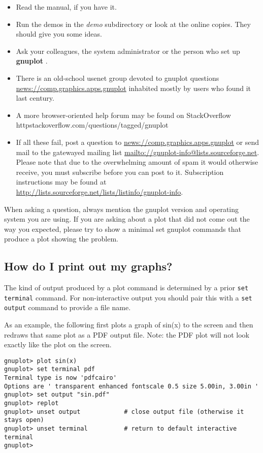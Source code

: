 \documentclass[a4paper,11pt]{article}
\def\http#1{{\small\href{http://#1}{\url{http://#1}}}}
\def\mailto#1{{\small\href{mailto://#1}{\url{mailto://#1}}}}
\def\news#1{\href{news://#1}{\url{news://#1}}}
\newcommand{\news}[1]%
            {\def~{\~{}}\htmladdnormallink{\latex{\url{#1}}\html{\textit{#1}}}%
                {news:#1}%
            }
\newcommand{\mailto}[1]%
            {\htmladdnormallink{\latex{\url{<#1>}}\html{\textit{#1}}}%
                {mailto:#1}%
            }
\newcommand{\http}[1]%
            {\htmladdnormallink{\latex{\url{http://#1}}%
                    \html{\textit{http://#1}}}%
                {http://#1}%
            }
\newcommand{\gnuplot}{\textbf{gnuplot }}
\begin{document}
\begin{itemize}
\item
Read the manual, if you have it.

\item
Run the demos in the {\em demo} subdirectory or look at the 
online copies. They should give you some ideas.

\item
Ask your colleagues, the system administrator or the person who
set up \gnuplot.

\item
There is an old-school usenet group devoted to gnuplot questions
\news{comp.graphics.apps.gnuplot}
inhabited mostly by users who found it last century.

\item
A more browser-oriented help forum may be found on StackOverflow
http{stackoverflow.com/questions/tagged/gnuplot}

\item
If all these fail, post a question to \news{comp.graphics.apps.gnuplot} or send mail
to the gatewayed mailing list \mailto{gnuplot-info@lists.sourceforge.net}.
Please note that due to the overwhelming amount of spam it would otherwise receive,
you must subscribe before you can post to it. Subscription instructions 
may be found at
\http{lists.sourceforge.net/lists/listinfo/gnuplot-info}.

\end{itemize}
When asking a question, always mention the gnuplot version and
operating system you are using.  If you are asking about a plot that 
did not come out the way you expected, please try to show a minimal
set gnuplot commands that produce a plot showing the problem.


\subsection{How do I print out my graphs?}

The kind of output produced by a plot command is determined by a
prior \verb+set terminal+ command.  For non-interactive output
you should pair this with a \verb+set output+ command to provide
a file name.

As an example, the following first plots a graph of sin(x) to the
screen and then redraws that same plot as a PDF output file.
Note: the PDF plot will not look exactly like the plot on the screen.

\small
\begin{verbatim}
gnuplot> plot sin(x)
gnuplot> set terminal pdf
Terminal type is now 'pdfcairo'
Options are ' transparent enhanced fontscale 0.5 size 5.00in, 3.00in '
gnuplot> set output "sin.pdf"
gnuplot> replot
gnuplot> unset output            # close output file (otherwise it stays open)
gnuplot> unset terminal          # return to default interactive terminal
gnuplot>
\end{verbatim}
\normalsize
\end{document}
